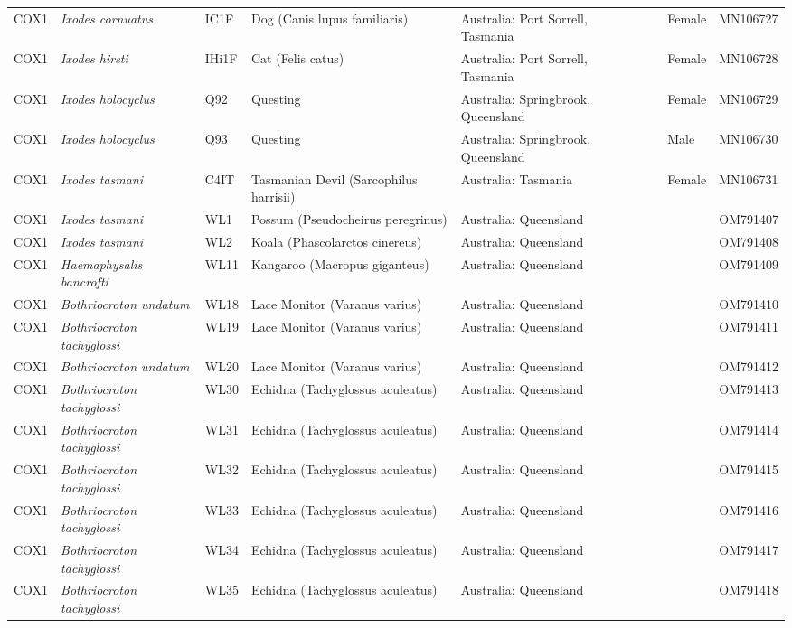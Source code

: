 \documentclass[a4paper, nobind]{templates/ociamthesis}
\begin{document}
\begin{landscape}
\begin{longtable}[t]{l>{}lllllll}
COX1 & \em{Ixodes cornuatus} & IC1F & Dog (Canis lupus familiaris) & Australia: Port Sorrell, Tasmania &  & Female & MN106727\\
COX1 & \em{Ixodes hirsti} & IHi1F & Cat (Felis catus) & Australia: Port Sorrell, Tasmania &  & Female & MN106728\\
COX1 & \em{Ixodes holocyclus} & Q92 & Questing & Australia: Springbrook, Queensland &  & Female & MN106729\\
COX1 & \em{Ixodes holocyclus} & Q93 & Questing & Australia: Springbrook, Queensland &  & Male & MN106730\\
COX1 & \em{Ixodes tasmani} & C4IT & Tasmanian Devil (Sarcophilus harrisii) & Australia: Tasmania &  & Female & MN106731\\
COX1 & \em{Ixodes tasmani} & WL1 & Possum (Pseudocheirus peregrinus) & Australia: Queensland &  &  & OM791407\\
COX1 & \em{Ixodes tasmani} & WL2 & Koala (Phascolarctos  cinereus) & Australia: Queensland &  &  & OM791408\\
COX1 & \em{Haemaphysalis bancrofti} & WL11 & Kangaroo (Macropus giganteus) & Australia: Queensland &  &  & OM791409\\
COX1 & \em{Bothriocroton undatum} & WL18 & Lace Monitor (Varanus varius) & Australia: Queensland &  &  & OM791410\\
COX1 & \em{Bothriocroton tachyglossi} & WL19 & Lace Monitor (Varanus varius) & Australia: Queensland &  &  & OM791411\\
COX1 & \em{Bothriocroton undatum} & WL20 & Lace Monitor (Varanus varius) & Australia: Queensland &  &  & OM791412\\
COX1 & \em{Bothriocroton tachyglossi} & WL30 & Echidna (Tachyglossus aculeatus) & Australia: Queensland &  &  & OM791413\\
COX1 & \em{Bothriocroton tachyglossi} & WL31 & Echidna (Tachyglossus aculeatus) & Australia: Queensland &  &  & OM791414\\
COX1 & \em{Bothriocroton tachyglossi} & WL32 & Echidna (Tachyglossus aculeatus) & Australia: Queensland &  &  & OM791415\\
COX1 & \em{Bothriocroton tachyglossi} & WL33 & Echidna (Tachyglossus aculeatus) & Australia: Queensland &  &  & OM791416\\
COX1 & \em{Bothriocroton tachyglossi} & WL34 & Echidna (Tachyglossus aculeatus) & Australia: Queensland &  &  & OM791417\\
COX1 & \em{Bothriocroton tachyglossi} & WL35 & Echidna (Tachyglossus aculeatus) & Australia: Queensland &  &  & OM791418\\

\end{longtable}
\end{landscape}
\end{document}
